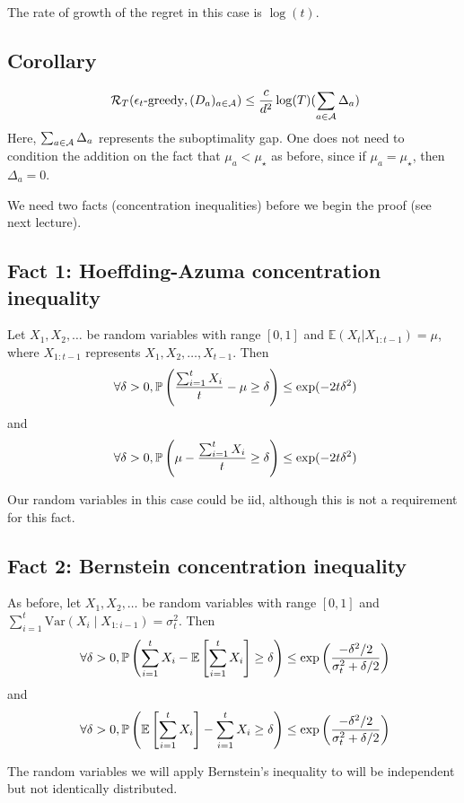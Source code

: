 \documentclass[11pt]{article}
\begin{document}
The rate of growth of the regret in this case is $\log(t)$.

\subsection{Corollary}
\[
\ \mathcal{R}_T(\epsilon_t\text{-greedy}, (D_a)_{a \in \mathcal{A}}) \le \frac{c}{d^2} \log(T) (\sum_{a \in \mathcal{A}} \Delta_a)
\]
Here, $\sum_{a \in \mathcal{A}} \Delta_a$ represents the suboptimality gap.  One does not need to condition the addition on the fact that $\mu_a < \mu_\star$ as before, since if $\mu_a = \mu_\star$, then $\Delta_a = 0$.  

We need two facts (concentration inequalities) before we begin the proof (see next lecture).

\subsection{Fact 1: Hoeffding-Azuma concentration inequality}
Let $X_1, X_2, \ldots$ be random variables with range $[0, 1]$ and $\mathbb{E}(X_t | X_{1:t-1}) = \mu$, where $X_{1:t-1}$ represents $X_1, X_2, \ldots, X_{t-1}$.  Then 
\[
\ \forall \delta > 0, \mathbb{P}\left( \frac{\sum_{i=1}^t X_i}{t} - \mu \ge \delta \right) \le \exp(-2t\delta^2)
\]
 and 
 \[
 \ \forall \delta >0, \mathbb{P}\left( \mu -\frac{\sum_{i=1}^t X_i}{t} \ge \delta \right) \le \exp(-2t\delta^2)
 \]

Our random variables in this case could be iid, although this is not a requirement for this fact.

\subsection{Fact 2: Bernstein concentration inequality}
As before, let $X_1, X_2, \ldots$ be random variables with range $[0,1]$ and $\sum_{i=1}^t \mathrm{Var}(X_i \mid X_{1:i-1}) = \sigma_t^2$.  Then 
\[
\ \forall \delta>0, \mathbb{P}\left( \sum_{i=1}^t X_i - \mathbb{E}\left[ \sum_{i=1}^t X_i \right] \ge \delta \right) \le \exp \left( \frac{-\delta^2/2}{\sigma_t^2+ \delta/2} \right)
\]
and 
\[
\ \forall \delta >0, \mathbb{P}\left(  \mathbb{E}\left[ \sum_{i=1}^t X_i \right] - \sum_{i=1}^t X_i \ge \delta \right) \le \exp \left( \frac{-\delta^2/2}{\sigma_t^2+ \delta/2} \right)
\]

The random variables we will apply Bernstein's inequality to will be independent but not identically distributed.


\end{document}

